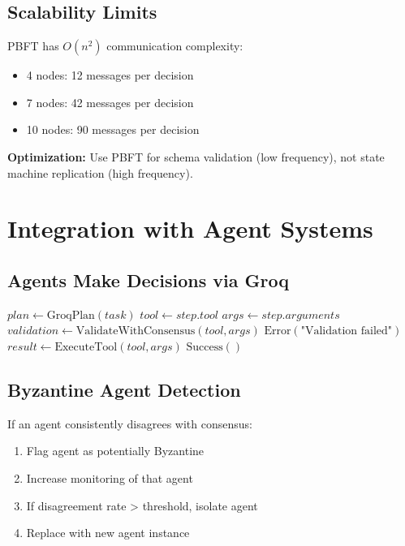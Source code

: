 \subsection{Scalability Limits}

PBFT has \(O(n^2)\) communication complexity:

\begin{itemize}
    \item 4 nodes: 12 messages per decision
    \item 7 nodes: 42 messages per decision
    \item 10 nodes: 90 messages per decision
\end{itemize}

\textbf{Optimization:} Use PBFT for schema validation (low frequency), not state machine replication (high frequency).

\section{Integration with Agent Systems}

\subsection{Agents Make Decisions via Groq}

\begin{algorithm}
\caption{Agent Decision with Consensus}
\begin{algorithmic}[1]
    \State $plan \gets \text{GroqPlan}(task)$
        \State $tool \gets step.tool$
        \State $args \gets step.arguments$
        \State $validation \gets \text{ValidateWithConsensus}(tool, args)$
            \State \Return $\text{Error}(\text{"Validation failed"})$
        \EndIf
        \State $result \gets \text{ExecuteTool}(tool, args)$
    \EndFor
    \State \Return $\text{Success}()$
\EndProcedure
\end{algorithmic}
\end{algorithm}

\subsection{Byzantine Agent Detection}

If an agent consistently disagrees with consensus:

\begin{enumerate}
    \item Flag agent as potentially Byzantine
    \item Increase monitoring of that agent
    \item If disagreement rate > threshold, isolate agent
    \item Replace with new agent instance
\end{enumerate}

